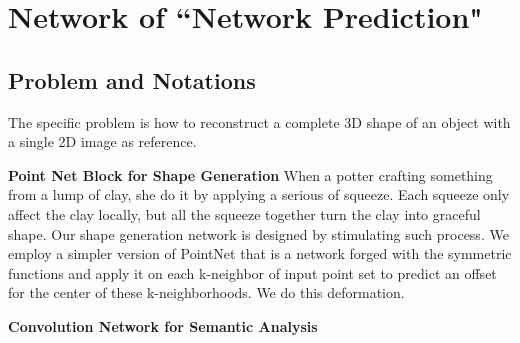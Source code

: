 \section{Network of ``Network Prediction"}
\subsection{Problem and Notations}
The specific problem is how to reconstruct a complete 3D shape of an object with a single 2D image as reference.  

\noindent \textbf{Point Net Block for Shape Generation}
When a potter crafting something from a lump of clay, she do it by applying a serious of squeeze. Each squeeze only affect the clay locally, but all the squeeze together turn the clay into graceful shape. Our shape generation network is designed by stimulating such process. We employ a simpler version of PointNet\cite{PointNet} that is a network forged with the symmetric functions and apply it on each k-neighbor of input point set to predict an offset for the center of these k-neighborhoods. We do this deformation. 

\noindent \textbf{Convolution Network for Semantic Analysis}



